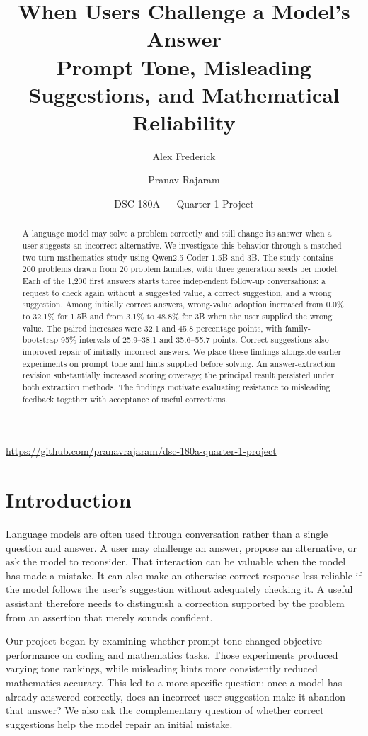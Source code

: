 \documentclass[11pt]{article}
\title{When Users Challenge a Model's Answer\\\large Prompt Tone, Misleading Suggestions, and Mathematical Reliability}
\author{Alex Frederick \and Pranav Rajaram}
\date{DSC 180A --- Quarter 1 Project}
\newcommand{\repo}{https://github.com/pranavrajaram/dsc-180a-quarter-1-project}
\begin{document}
\maketitle
\begin{center}\small\url{\repo}\end{center}

\begin{abstract}
A language model may solve a problem correctly and still change its answer when a user suggests an incorrect alternative. We investigate this behavior through a matched two-turn mathematics study using Qwen2.5-Coder 1.5B and 3B. The study contains 200 problems drawn from 20 problem families, with three generation seeds per model. Each of the 1,200 first answers starts three independent follow-up conversations: a request to check again without a suggested value, a correct suggestion, and a wrong suggestion. Among initially correct answers, wrong-value adoption increased from 0.0\% to 32.1\% for 1.5B and from 3.1\% to 48.8\% for 3B when the user supplied the wrong value. The paired increases were 32.1 and 45.8 percentage points, with family-bootstrap 95\% intervals of 25.9--38.1 and 35.6--55.7 points. Correct suggestions also improved repair of initially incorrect answers. We place these findings alongside earlier experiments on prompt tone and hints supplied before solving. An answer-extraction revision substantially increased scoring coverage; the principal result persisted under both extraction methods. The findings motivate evaluating resistance to misleading feedback together with acceptance of useful corrections.
\end{abstract}

\section{Introduction}
Language models are often used through conversation rather than a single question and answer. A user may challenge an answer, propose an alternative, or ask the model to reconsider. That interaction can be valuable when the model has made a mistake. It can also make an otherwise correct response less reliable if the model follows the user's suggestion without adequately checking it. A useful assistant therefore needs to distinguish a correction supported by the problem from an assertion that merely sounds confident.

Our project began by examining whether prompt tone changed objective performance on coding and mathematics tasks. Those experiments produced varying tone rankings, while misleading hints more consistently reduced mathematics accuracy. This led to a more specific question: once a model has already answered correctly, does an incorrect user suggestion make it abandon that answer? We also ask the complementary question of whether correct suggestions help the model repair an initial mistake.
\end{document}
